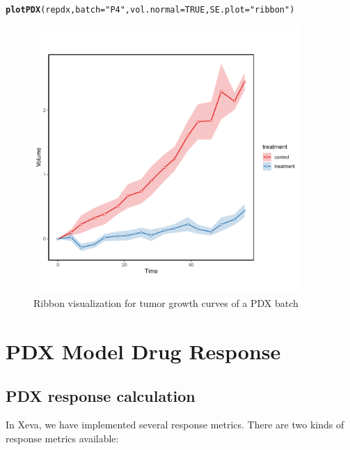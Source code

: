 \documentclass{article}\usepackage[]{graphicx}\usepackage[]{xcolor}
\makeatletter
\newcommand{\hlnum}[1]{\textcolor[rgb]{0.686,0.059,0.569}{#1}}%
\newcommand{\hlstr}[1]{\textcolor[rgb]{0.192,0.494,0.8}{#1}}%
\newcommand{\hlstd}[1]{\textcolor[rgb]{0.345,0.345,0.345}{#1}}%
\newcommand{\hlkwc}[1]{\textcolor[rgb]{0.333,0.667,0.333}{#1}}%
\newcommand{\hlkwd}[1]{\textcolor[rgb]{0.737,0.353,0.396}{\textbf{#1}}}%
\newenvironment{kframe}{%
 \def\at@end@of@kframe{}%
 \ifinner\ifhmode%
  \def\at@end@of@kframe{\end{minipage}}%
  \begin{minipage}{\columnwidth}%
 \fi\fi%
 \def\FrameCommand##1{\hskip\@totalleftmargin \hskip-\fboxsep
 \colorbox{shadecolor}{##1}\hskip-\fboxsep
     \hskip-\linewidth \hskip-\@totalleftmargin \hskip\columnwidth}%
 \MakeFramed {\advance\hsize-\width
   \@totalleftmargin\z@ \linewidth\hsize
   \@setminipage}}%
 {\par\unskip\endMakeFramed%
 \at@end@of@kframe}
\newenvironment{knitrout}{}{} %
\makeatother
\begin{document}
\begin{knitrout}
\color{fgcolor}\begin{kframe}
\begin{alltt}
\hlkwd{plotPDX}\hlstd{(repdx,} \hlkwc{batch} \hlstd{=} \hlstr{"P4"}\hlstd{,} \hlkwc{vol.normal} \hlstd{=} \hlnum{TRUE}\hlstd{,}  \hlkwc{SE.plot} \hlstd{=} \hlstr{"ribbon"}\hlstd{)}
\end{alltt}
\end{kframe}\begin{figure}
\includegraphics[width=4in]{figure/repplot3-1} \caption[Ribbon visualization for tumor growth curves of a PDX batch]{Ribbon visualization for tumor growth curves of a PDX batch}\label{fig:repplot3}
\end{figure}

\end{knitrout}


\section{PDX Model Drug Response}  \label{response}

\subsection{PDX response calculation}
In Xeva, we have implemented several response metrics.
There are two kinds of response metrics available:
\end{document}
